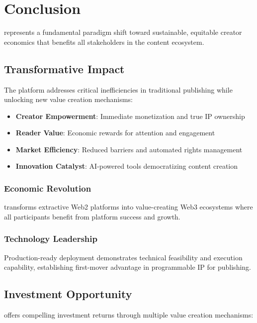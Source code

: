 \section{Conclusion}
\label{sec:conclusion}

\storyhouse{} represents a fundamental paradigm shift toward sustainable, equitable creator economics that benefits all stakeholders in the content ecosystem.

\subsection{Transformative Impact}

The platform addresses critical inefficiencies in traditional publishing while unlocking new value creation mechanisms:

\begin{itemize}
    \item \textbf{Creator Empowerment}: Immediate monetization and true IP ownership
    \item \textbf{Reader Value}: Economic rewards for attention and engagement
    \item \textbf{Market Efficiency}: Reduced barriers and automated rights management
    \item \textbf{Innovation Catalyst}: AI-powered tools democratizing content creation
\end{itemize}

\subsubsection{Economic Revolution}

\storyhouse{} transforms extractive Web2 platforms into value-creating Web3 ecosystems where all participants benefit from platform success and growth.

\subsubsection{Technology Leadership}

Production-ready deployment demonstrates technical feasibility and execution capability, establishing first-mover advantage in programmable IP for publishing.

\subsection{Investment Opportunity}

\storyhouse{} offers compelling investment returns through multiple value creation mechanisms:

